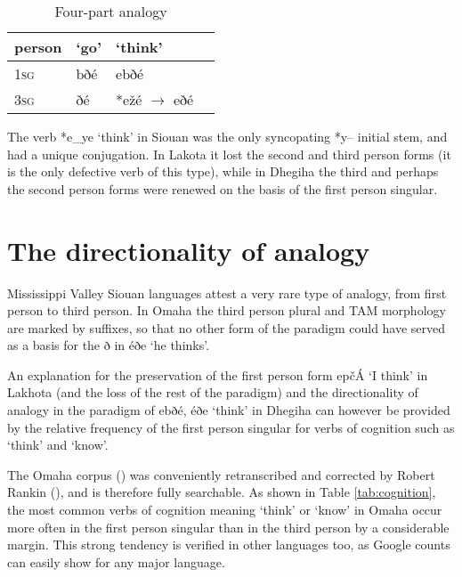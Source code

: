 \documentclass[oneside,a4paper,11pt]{article}
\newcommand{\ipa}[1]{{\phon#1}} %
\begin{document}
 \begin{table}[h]
\caption{Four-part analogy}  \label{tab:four} \centering
\begin{tabular}{l|l|ll}
\toprule
person & `go' & `think' \\
 \midrule
\textsc{1sg} &\ipa{bðé} & \ipa{ebðé} \\
\textsc{3sg}&\ipa{ðé} & *\ipa{ežé} $\rightarrow$ \ipa{eðé} \\
\bottomrule			
\end{tabular}
\end{table} 


The verb *\ipa{e\_ye} `think' in Siouan was the only syncopating *\ipa{y--} initial stem, and had a unique conjugation. In Lakota it lost the second and third person forms (it is the only defective verb of this type), while in Dhegiha the third and perhaps the second person forms were renewed on the basis of the first person singular.


\section{The directionality of analogy} \label{sec:directionality}

Mississippi Valley Siouan languages attest  a very rare type of analogy, from first person to third person. In Omaha the third person plural  and TAM morphology are marked by suffixes, so that no other form of the paradigm could have served as a basis for the \ipa{ð} in \ipa{éðe} `he thinks'.

An explanation for the preservation of the first person form \ipa{epčÁ} `I think' in Lakhota (and the loss of the rest of the paradigm) and the directionality of analogy in the paradigm of \ipa{ebðé}, \ipa{éðe} `think' in Dhegiha can however be provided by the relative frequency of the first person singular for verbs of cognition such as   `think' and `know'.

The Omaha corpus (\citealt{dorsey1890cegiha}) was conveniently retranscribed and corrected by Robert Rankin (\citealt{rankin08dhegiha}), and is therefore fully searchable. As shown in Table \ref{tab:cognition}, the most common  verbs of cognition meaning `think' or `know' in Omaha occur more often in the first person singular than in the third person by a considerable margin. This strong tendency is verified in other languages too, as Google counts can easily show for any major language.%
\end{document}
